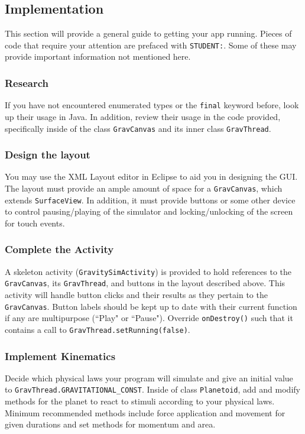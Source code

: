 \subsection{Implementation}
This section will provide a general guide to getting your app running.
Pieces of code that require your attention are prefaced with \verb=STUDENT:=.
Some of these may provide important information not mentioned here.

\subsubsection{Research}
If you have not encountered enumerated types or the \verb=final= keyword before, look up their usage in Java.
In addition, review their usage in the code provided, specifically inside of the class \verb=GravCanvas= and its inner class \verb=GravThread=.

\subsubsection{Design the layout}
You may use the XML Layout editor in Eclipse to aid you in designing the GUI.
The layout must provide an ample amount of space for a \verb=GravCanvas=, which extends \verb=SurfaceView=.
In addition, it must provide buttons or some other device to control pausing/playing of the simulator and locking/unlocking of the screen for touch events.

\subsubsection{Complete the Activity}
A skeleton activity (\verb=GravitySimActivity=) is provided to hold references to the \verb=GravCanvas=, its \verb=GravThread=, and buttons in the layout described above.
This activity will handle button clicks and their results as they pertain to the \verb=GravCanvas=.
Button labels should be kept up to date with their current function if any are multipurpose (``Play" or ``Pause").
Override \verb=onDestroy()= such that it contains a call to \verb=GravThread.setRunning(false)=.

\subsubsection{Implement Kinematics}
Decide which physical laws your program will simulate and give an initial value to \verb=GravThread.GRAVITATIONAL_CONST=.
Inside of class \verb=Planetoid=, add and modify methods for the planet to react to stimuli according to your physical laws.
Minimum recommended methods include force application and movement for given durations and set methods for momentum and area.

